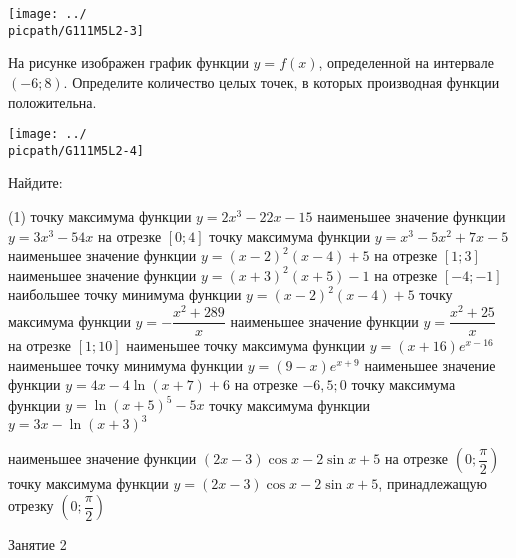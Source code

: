 \begin{class}[number=1]
\begin{listofex}
\begin{minipage}[t]{0.5\linewidth}
			\texttt{[image: ../\\picpath/G111M5L2-3]}
		\end{minipage}
		\item
		\begin{minipage}[t]{0.45\linewidth}
			На рисунке изображен график функции \(y = f(x)\), определенной на интервале \((-6; 8)\). Определите количество целых точек, в которых производная функции положительна.
		\end{minipage}
		\hspace{0.02\linewidth}
		\begin{minipage}[t]{0.5\linewidth}
			\texttt{[image: ../\\picpath/G111M5L2-4]}
		\end{minipage}
		\item Найдите:
		\begin{tasks}(1)
			\task точку максимума функции \(y = 2x^3 -22x-15\)
			\task наименьшее значение функции \(y = 3x^3 - 54x\) на отрезке \([0;4]\)
			\task точку максимума функции \(y = x^3 - 5x^2 + 7x -5\)
			\task наименьшее значение функции \(y=(x-2)^2(x-4)+5\) на отрезке \( [1;3] \)
			\task наименьшее значение функции \(y=(x+3)^2(x+5)-1\) на отрезке \( [-4;-1] \)
			\task наибольшее точку минимума функции \(y=(x-2)^2(x-4)+5\)
			\task точку максимума функции \(y = -\dfrac{x^2+289}{x}\)
			\task наименьшее значение функции \(y = \dfrac{x^2+25}{x}\) на отрезке \([1;10]\)
			\task наименьшее точку максимума функции \(y=(x+16)e^{x-16}\)
			\task наименьшее точку минимума функции \(y=(9-x)e^{x+9}\)
			\task наименьшее значение функции \(y=4x-4\ln(x+7)+6\) на отрезке \( -6,5; 0 \)
			\task точку максимума функции \(y=\ln(x+5)^5-5x\)
			\task точку максимума функции \(y=3x-\ln(x+3)^3\)
			
			\task наименьшее значение функции \( (2x-3)\cos x - 2 \sin x + 5 \) на отрезке \( \left( 0; \dfrac{ \pi }{ 2 } \right) \)
			\task точку максимума функции \( y=(2x-3)\cos x - 2\sin x + 5 \), принадлежащую отрезку \( \left( 0;\dfrac{ \pi }{ 2 } \right) \)
			
		\end{tasks}
	\end{listofex}
\end{class}

\begin{class}[number=2]
	\begin{listofex}
		\item Занятие 2
	\end{listofex}
\end{class}

